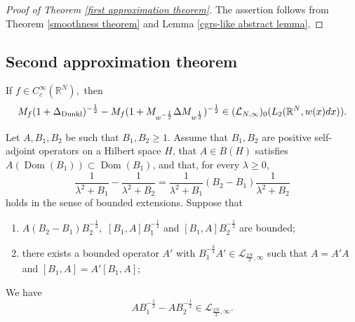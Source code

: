 \documentclass{amsart}
\begin{document}
\begin{proof}[Proof of Theorem \ref{first approximation theorem}] The assertion follows from Theorem \ref{smoothness theorem} and Lemma \ref{cgrs-like abstract lemma}.
\end{proof}

\subsection{Second approximation theorem}

\begin{theorem}\label{second approximation theorem} If $f\in C^{\infty}_c(\mathbb{R}^N),$ then
$$M_f(1+\Delta_{{\rm Dunkl}})^{-\frac12}-M_f(1+M_{w^{-\frac12}}\Delta M_{w^{\frac12}})^{-\frac12}\in (\mathcal{L}_{N,\infty})_0(L_2(\mathbb{R}^N,w(x)dx)).$$
\end{theorem}

\begin{lemma}\label{s10 abstract lemma}
Let $A,B_1,B_2$ be such that $B_1,B_2\geq1.$
{\color{red}
Assume that $B_1,B_2$ are positive self-adjoint
operators on a Hilbert space $H$, that $A\in B(H)$
satisfies
$A(\operatorname{Dom}(B_1))\subset\operatorname{Dom}(B_1)$,
and that, for every $\lambda\geq0$,
$$
\frac1{\lambda^2+B_1}-\frac1{\lambda^2+B_2}
=
\frac1{\lambda^2+B_1}
(B_2-B_1)
\frac1{\lambda^2+B_2}
$$
holds in the sense of bounded extensions.
}
Suppose that
\begin{enumerate}[{\rm (i)}]
\item\label{s10aa}
$A(B_2-B_1)B_2^{-\frac12},$
$[B_1,A]B_1^{-\frac12}$ and
$[B_1,A]B_2^{-\frac12}$ are bounded;
\item\label{s10ab}
there exists {\color{red}a bounded operator} $A'$
with
$B_1^{-\frac34}A'\in
\mathcal{L}_{\frac{2N}{3},\infty}$
such that
$A=A'A$ and $[B_1,A]=A'[B_1,A];$
\end{enumerate}
We have
$$
AB_1^{-\frac12}-AB_2^{-\frac12}
\in\mathcal{L}_{\frac{2N}{3},\infty}.
$$
\end{lemma}
\end{document}
